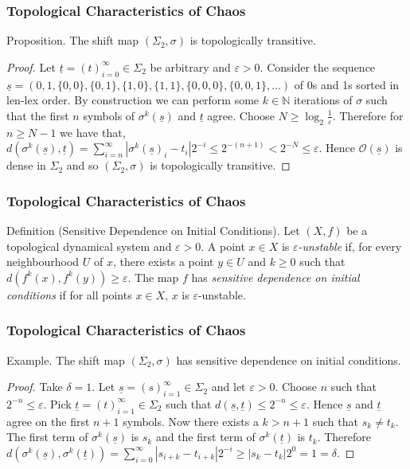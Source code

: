 \documentclass{beamer}
\begin{document}
\begin{frame}
    \frametitle{Topological Characteristics of Chaos}
    \begin{block}{Proposition.}
        The shift map $(\Sigma_2, \sigma)$ is topologically transitive. \cite{devaney}
        \begin{proof}
            Let $\underline{t} = (t)_{i=0}^{\infty} \in \Sigma_2$ be arbitrary and $\varepsilon > 0$. Consider the sequence $\underline{s} = (0, 1, \{0, 0\}, \{0, 1\}, \{1, 0\}, \{1, 1\}, \{0, 0, 0\}, \{0, 0, 1\}, \dots)$ of 0s and 1s sorted in len-lex order. By construction we can perform some $k \in \mathbb{N}$ iterations of $\sigma$ such that the first $n$ symbols of $\sigma^k(\underline{s})$ and $\underline{t}$ agree. Choose $N \geq \log_2{\frac{1}{\varepsilon}}$. Therefore for $n \geq N - 1$ we have that, $d(\sigma^k(\underline{s}), \underline{t}) = \sum_{i = n}^{\infty}|\sigma^k(\underline{s})_i - t_i|2^{-i} \leq 2^{-(n+1)} < 2^{-N} \leq \varepsilon$. Hence $\mathcal{O}(\underline{s})$ is dense in $\Sigma_2$ and so $(\Sigma_2, \sigma)$ is topologically transitive.
        \end{proof}
    \end{block}
\end{frame}

\begin{frame}
    \frametitle{Topological Characteristics of Chaos}
    \begin{block}{Definition (Sensitive Dependence on Initial Conditions).}
        Let $(X, f)$ be a topological dynamical system and $\varepsilon > 0$. A point $x \in X$ is \emph{$\varepsilon$-unstable} if, for every neighbourhood $U$ of $x$, there exists a point $y \in U$ and $k \geq 0$ such that $d\left(f^k(x), f^k(y)\right) \geq \varepsilon$. The map $f$ has \emph{sensitive dependence on initial conditions} if for all points $x \in X$, $x$ is $\varepsilon$-unstable.
    \end{block}
\end{frame}

\begin{frame}
    \frametitle{Topological Characteristics of Chaos}
    \begin{block}{Example.}
        The shift map $(\Sigma_2, \sigma)$ has sensitive dependence on initial conditions.
        \begin{proof}
            Take $\delta = 1$. Let $\underline{s} = (s)_{i=1}^{\infty} \in \Sigma_2$ and let $\varepsilon > 0$. Choose $n$ such that $2^{-n} \leq \varepsilon$. Pick $\underline{t} = (t)_{i=1}^{\infty} \in \Sigma_2$ such that $d(\underline{s}, \underline{t}) \leq 2^{-n} \leq \varepsilon$. Hence $\underline{s}$ and $\underline{t}$ agree on the first $n+1$ symbols. Now there exists a $k > n + 1$ such that $s_k \neq t_k$. The first term of $\sigma^k(\underline{s})$ is $s_k$ and the first term of $\sigma^k(\underline{t})$ is $t_k$. Therefore $d(\sigma^k(\underline{s}), \sigma^k(\underline{t})) = \sum_{i = 0}^{\infty}|s_{i+k} - t_{i+k}|2^{-i} \geq |s_k - t_k|2^{0} = 1 = \delta$.
        \end{proof}
    \end{block}
\end{frame}
\end{document}
